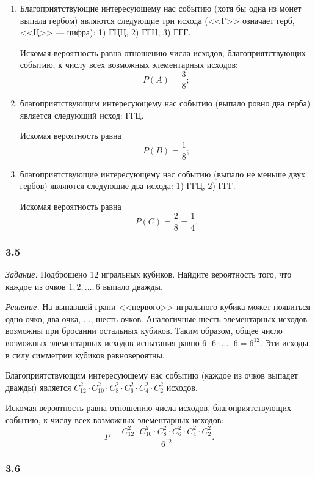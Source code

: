 \begin{enumerate}[label=\alph*)]
\item Благоприятствующие интересующему нас событию
(хотя бы одна из монет выпала гербом)
являются следующие три исхода (<<Г>> означает герб, <<Ц>> --- цифра): 1) ГЦЦ, 2) ГГЦ, 3) ГГГ.

Искомая вероятность равна отношению числа исходов, благоприятствующих событию, к числу всех возможных элементарных исходов:
$$P \left( A \right) =
\frac{3}{8};$$

\item благоприятствующим интересующему нас событию (выпало ровно два герба) является следующий исход: ГГЦ.

Искомая вероятность равна
$$P \left( B \right) =
\frac{1}{8};$$

\item благоприятствующие интересующему нас событию (выпало не меньше двух гербов) являются следующие два исхода: 1) ГГЦ, 2) ГГГ.

Искомая вероятность равна
$$P \left( C \right) =
\frac{2}{8} =
\frac{1}{4}.$$
\end{enumerate}

\subsubsection*{3.5}

\textit{Задание.} Подброшено 12 игральных кубиков.
Найдите вероятность того, что каждое из очков $1, 2, \dotsc, 6$ выпало дважды.

\textit{Решение.}
На выпавшей грани <<первого>> игрального кубика может появиться одно очко, два очка, $ \dotsc $, шесть очков.
Аналогичные шесть элементарных исходов возможны при бросании остальных кубиков.
Таким образом, общее число возможных элементарных исходов испытания равно $6 \cdot 6 \cdot \dotsc \cdot 6 = 6^{12}$.
Эти исходы в силу симметрии кубиков равновероятны.

Благоприятствующим интересующему нас событию
(каждое из очков выпадет дважды)
является $C_{12}^2 \cdot C_{10}^2 \cdot C_8^2 \cdot C_6^2 \cdot C_4^2 \cdot C_2^2$ исходов.

Искомая вероятность равна отношению числа исходов, благоприятствующих событию,
к числу всех возможных элементарных исходов:
$$P =
\frac{C_{12}^2 \cdot C_{10}^2 \cdot C_8^2 \cdot C_6^2 \cdot C_4^2 \cdot C_2^2}{6^{12}}.$$

\subsubsection*{3.6}


